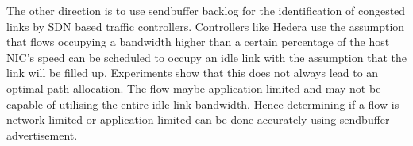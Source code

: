 \documentclass[a4paper,11pt]{article}
\begin{document}
The other direction is to use sendbuffer backlog for the identification
of congested links by SDN based traffic controllers. Controllers like
Hedera use the assumption that flows occupying a bandwidth higher than
a certain percentage of the host NIC's speed can be scheduled to
occupy an idle link with the assumption that the link will be filled
up. Experiments show that this does not always lead to an optimal
path allocation. The flow maybe application limited and may not
be capable of utilising the entire idle link bandwidth. Hence
determining if a flow is network limited or application limited
can be done accurately using sendbuffer advertisement.

\printbibliography
\end{document}
